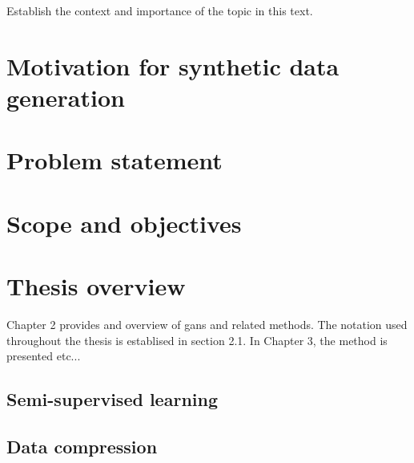 Establish the context and importance of the topic in this text.

\section{Motivation for synthetic data generation}

\section{Problem statement}

\section{Scope and objectives}

\section{Thesis overview}
Chapter 2 provides and overview of \acrlong{gans} and related methods. The notation used throughout the thesis is establised in section 2.1. In Chapter 3, the method is presented etc...

\subsection{Semi-supervised learning}

\subsection{Data compression}

